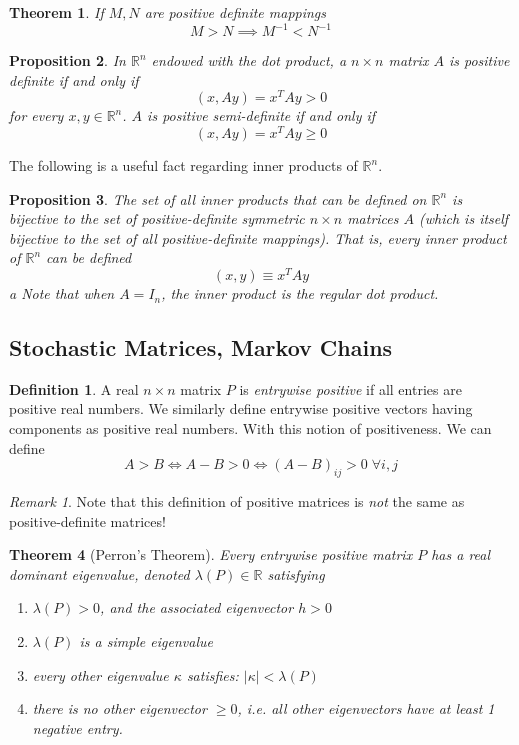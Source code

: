 \documentclass{article}
\newtheorem{theorem}{Theorem}[section]
\newtheorem{proposition}[theorem]{Proposition}
\theoremstyle{remark}
\newtheorem*{remark}{Remark}
\theoremstyle{definition}
\newtheorem{definition}{Definition}[section]
\begin{document}
\begin{theorem}
If $M, N$ are positive definite mappings 
\[ M > N \implies M^{-1} < N^{-1}\]
\end{theorem}

\begin{proposition}
In $\mathbb{R}^n$ endowed with the dot product, a $n \times n$ matrix $A$ is positive definite if and only if 
\[(x, A y) = x^T A y > 0 \]
for every $x, y \in \mathbb{R}^n$. $A$ is positive semi-definite if and only if 
\[(x, A y) = x^T A y \geq 0\]
\end{proposition}

The following is a useful fact regarding inner products of $\mathbb{R}^n$. 
\begin{proposition}
The set of all inner products that can be defined on $\mathbb{R}^n$ is bijective to the set of positive-definite symmetric $n \times n$ matrices $A$ (which is itself bijective to the set of all positive-definite mappings). That is, every inner product of $\mathbb{R}^n$ can be defined 
\[(x, y) \equiv x^T A y\]a
Note that when $A = I_n$, the inner product is the regular dot product.
\end{proposition}

\subsection{Stochastic Matrices, Markov Chains}
\begin{definition}
A real $n \times n$ matrix $P$ is \textit{entrywise positive} if all entries are positive real numbers. We similarly define entrywise positive vectors having components as positive real numbers. With this notion of positiveness. We can define
\[A > B \iff A - B > 0 \iff (A-B)_{i j} > 0 \; \forall i, j\]
\end{definition}

\begin{remark}
Note that this definition of positive matrices is \textit{not} the same as positive-definite matrices! 
\end{remark}

\begin{theorem}[Perron's Theorem]
Every entrywise positive matrix $P$ has a real \textit{dominant eigenvalue}, denoted $\lambda(P) \in \mathbb{R}$ satisfying
\begin{enumerate}
    \item $\lambda(P) > 0$, and the associated eigenvector $h >0$
    \item $\lambda(P)$ is a simple eigenvalue
    \item every other eigenvalue $\kappa$ satisfies: $|\kappa| < \lambda(P)$
    \item there is no other eigenvector $\geq 0$, i.e. all other eigenvectors have at least 1 negative entry.
\end{enumerate}
\end{theorem}
\end{document}
